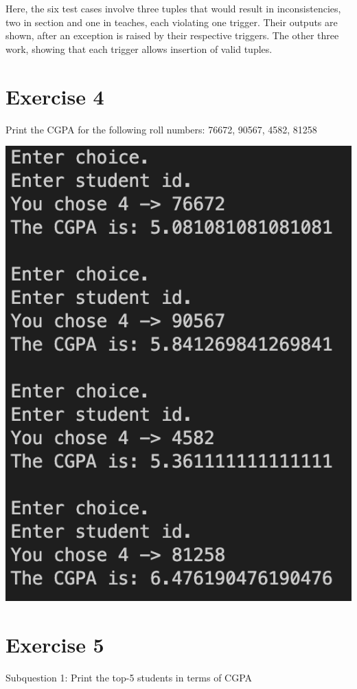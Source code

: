 \documentclass[12pt]{amsart}
\begin{document}
        Here, the six test cases involve three tuples that would result in inconsistencies, two in section and one in teaches, each violating one trigger. Their outputs are shown, after an exception is raised by their respective triggers.
        The other three work, showing that each trigger allows insertion of valid tuples.
    
        \section*{Exercise 4}

    Print the CGPA for the following roll numbers: 76672, 90567, 4582, 81258

        \includegraphics[scale = 0.5]{4.png}
\newpage
    \section*{Exercise 5}

    Subquestion 1: Print the top-5 students in terms of CGPA
\end{document}
